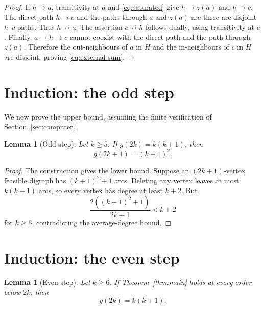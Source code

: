 \documentclass[11pt]{amsart}
\newtheorem{lemma}[theorem]{Lemma}
\theoremstyle{definition}
\begin{document}
\begin{proof}
If $h\to a$, transitivity at $a$ and \eqref{eq:saturated} give
$h\to z(a)$ and $h\to c$.  The direct path $h\to c$ and the paths through
$a$ and $z(a)$ are three arc-disjoint $h$--$c$ paths.  Thus $h\not\to a$.
The assertion $c\not\to h$ follows dually, using transitivity at $c$.
Finally, $a\to h\to c$ cannot coexist with the direct path and the path
through $z(a)$.  Therefore the out-neighbours of $a$ in $H$ and the
in-neighbours of $c$ in $H$ are disjoint, proving
\eqref{eq:external-sum}.
\end{proof}

\section{Induction: the odd step}

We now prove the upper bound, assuming the finite verification of
Section~\ref{sec:computer}.

\begin{lemma}[Odd step]\label{lem:odd}
Let $k\ge5$.  If $g(2k)=k(k+1)$, then
\[
 g(2k+1)=(k+1)^2.
\]
\end{lemma}

\begin{proof}
The construction gives the lower bound.  Suppose an $(2k+1)$-vertex
feasible digraph has $(k+1)^2+1$ arcs.  Deleting any vertex leaves at most
$k(k+1)$ arcs, so every vertex has degree at least $k+2$.  But
\[
 \frac{2((k+1)^2+1)}{2k+1}<k+2
\]
for $k\ge5$, contradicting the average-degree bound.
\end{proof}

\section{Induction: the even step}

\begin{lemma}[Even step]\label{lem:even}
Let $k\ge6$.  If Theorem~\ref{thm:main} holds at every order below $2k$,
then
\[
 g(2k)=k(k+1).
\]
\end{lemma}
\end{document}
